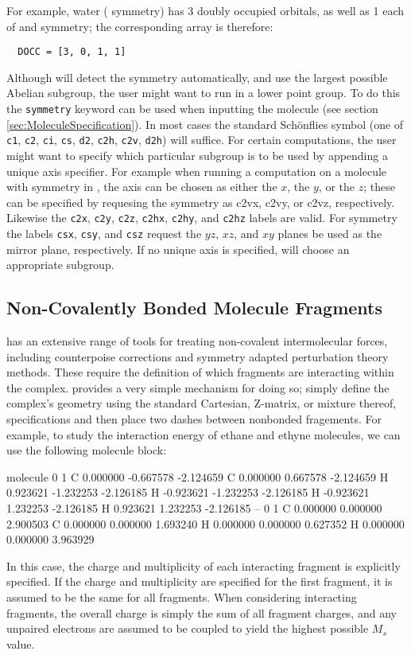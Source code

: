 For example, water ( symmetry) has 3 doubly occupied 
orbitals, as well as 1 each of  and  symmetry; the
corresponding  array is therefore:
\begin{verbatim}
  DOCC = [3, 0, 1, 1]
\end{verbatim}

Although \PSIfour will detect the symmetry automatically, and use the largest
possible Abelian subgroup, the user might want to run in a lower point group.
To do this the {\tt symmetry} keyword can be used when inputting the molecule
(see section \ref{sec:MoleculeSpecification}).  In most cases the standard
Sch\"onflies symbol (one of {\tt c1}, {\tt c2}, {\tt ci}, {\tt cs}, {\tt d2},
{\tt c2h}, {\tt c2v}, {\tt d2h}) will suffice.
For certain computations, the user might want to specify which particular
subgroup is to be used by appending a unique axis specifier.  For example when
running a computation on a molecule with  symmetry in , the
 axis can be chosen as either the $x$, the $y$, or the $z$; these can
be specified by requesing the symmetry as c2vx, c2vy, or c2vz, respectively.
Likewise the {\tt c2x}, {\tt c2y}, {\tt c2z}, {\tt c2hx}, {\tt c2hy}, and {\tt c2hz}
labels are valid.  For  symmetry the labels {\tt csx}, {\tt csy}, and
{\tt csz} request the $yz$, $xz$, and $xy$ planes be used as the mirror plane,
respectively.  If no unique axis is specified, \PSIfour will choose an appropriate
subgroup.

\subsection{Non-Covalently Bonded Molecule Fragments}

\PSIfour has an extensive range of tools for treating non-covalent
intermolecular forces, including counterpoise corrections and symmetry adapted
perturbation theory methods. These require the definition of which fragments
are interacting within the complex. \PSIfour provides a very simple mechanism
for doing so; simply define the complex's geometry using the standard
Cartesian, Z-matrix, or mixture thereof, specifications and then place two
dashes between nonbonded fragements. For example, to study the interaction
energy of ethane and ethyne molecules, we can use the following molecule
block:
\begin{Snippet}
molecule{
  0 1
  C  0.000000 -0.667578  -2.124659
  C  0.000000  0.667578  -2.124659
  H  0.923621 -1.232253  -2.126185
  H -0.923621 -1.232253  -2.126185
  H -0.923621  1.232253  -2.126185
  H  0.923621  1.232253  -2.126185
  --
  0 1
  C 0.000000 0.000000 2.900503
  C 0.000000 0.000000 1.693240
  H 0.000000 0.000000 0.627352
  H 0.000000 0.000000 3.963929
}
\end{Snippet}
In this case, the charge and multiplicity of each interacting fragment is
explicitly specified. If the charge and multiplicity are specified for the
first fragment, it is assumed to be the same for all fragments. When
considering interacting fragments, the overall charge is simply the sum of all
fragment charges, and any unpaired electrons are assumed to be coupled to
yield the highest possible $M_s$ value.

